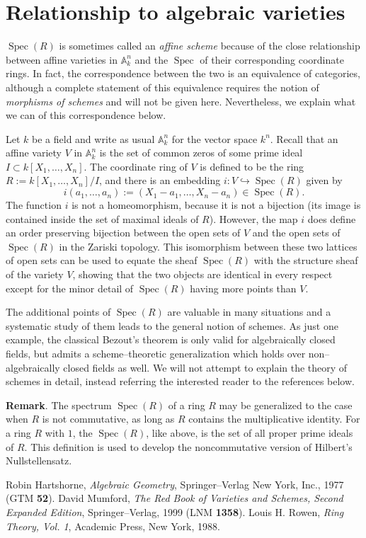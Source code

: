 \documentclass[12pt]{article}
\newcommand{\A}{\mathbb{A}}
\newcommand{\Spec}{\operatorname{Spec}}
\begin{document}
\section{Relationship to algebraic varieties}\label{variety}

$\Spec(R)$ is sometimes called an {\em affine scheme} because of the
close relationship between affine varieties in $\A_k^n$ and the
$\Spec$ of their corresponding coordinate rings. In fact, the
correspondence between the two is an equivalence of categories,
although a complete statement of this equivalence requires the notion
of {\em morphisms of schemes} and will not be given
here. Nevertheless, we explain what we can of this correspondence
below.

Let $k$ be a field and write as usual $\A_k^n$ for the vector space
$k^n$. Recall that an affine variety $V$ in $\A_k^n$ is the set of
common zeros of some prime ideal $I \subset k[X_1,
\ldots, X_n]$. The coordinate ring of $V$ is defined to be
the ring $R := k[X_1, \ldots, X_n]/I$, and there is an embedding $i: V \hookrightarrow \Spec(R)$ given by
$$
i(a_1, \ldots, a_n) := (X_1 - a_1, \ldots, X_n - a_n) \in \Spec(R).
$$
The function $i$ is not a homeomorphism, because it is not a
bijection (its image is contained inside the set of maximal ideals of $R$). However,
the map $i$ does define an order preserving bijection between the open
sets of $V$ and the open sets of $\Spec(R)$ in the Zariski topology.
This isomorphism between these two lattices of open sets can be used
to equate the sheaf $\Spec(R)$ with the structure sheaf of the variety
$V$, showing that the two objects are identical in every respect
except for the minor detail of $\Spec(R)$ having more points than
$V$.

The additional points of $\Spec(R)$ are valuable in many situations
and a systematic study of them leads to the general notion of
schemes. As just one example, the classical Bezout's theorem is only
valid for algebraically closed fields, but admits a scheme--theoretic
generalization which holds over non--algebraically closed fields as
well. We will not attempt to explain the theory of schemes in detail,
instead referring the interested reader to the references below.

\textbf{Remark}.  The spectrum $\Spec(R)$ of a ring $R$ may be generalized to the case when $R$ is not commutative, as long as $R$ contains the multiplicative identity.  For a ring $R$ with $1$, the $\Spec(R)$, like above, is the set of all proper prime ideals of $R$.  This definition is used to develop the noncommutative version of Hilbert's Nullstellensatz.

\begin{thebibliography}{9}
 Robin Hartshorne, {\em Algebraic Geometry},
Springer--Verlag New York, Inc., 1977 (GTM {\bf 52}).
 David Mumford, {\em The Red Book of Varieties and
Schemes, Second Expanded Edition}, Springer--Verlag, 1999 (LNM {\bf
1358}).
 Louis H. Rowen, {\em Ring Theory, Vol. 1}, Academic Press, New York, 1988.
\end{thebibliography}
\end{document}
